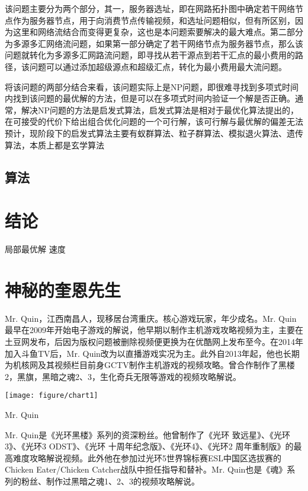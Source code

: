 \documentclass[a4paper,11pt,onecolumn,twoside]{article}
\makeatletter
\newenvironment{figurehere}
  {\def\@captype{figure}}
  {}
\makeatother
\begin{document}
\begin{multicols}{2}
该问题主要分为两个部分，其一，服务器选址，即在网路拓扑图中确定若干网络节点作为服务器节点，用于向消费节点传输视频，和选址问题相似，但有所区别，因为这里和网络流结合而变得更复杂，这也是本问题索要解决的最大难点。第二部分为多源多汇网络流问题，如果第一部分确定了若干网络节点为服务器节点，那么该问题就转化为多源多汇网路流问题，即寻找从若干源点到若干汇点的最小费用的路径，该问题可以通过添加超级源点和超级汇点，转化为最小费用最大流问题。

将该问题的两部分结合来看，该问题实际上是NP问题，即很难寻找到多项式时间内找到该问题的最优解的方法，但是可以在多项式时间内验证一个解是否正确。通常，解决NP问题的方法是启发式算法，启发式算法是相对于最优化算法提出的，在可接受的代价下给出组合优化问题的一个可行解，该可行解与最优解的偏差无法预计，现阶段下的启发式算法主要有蚁群算法、粒子群算法、模拟退火算法、遗传算法，本质上都是玄学算法

\subsection{算法}

\section{结论}
局部最优解
速度
\section{神秘的奎恩先生}

Mr. Quin，江西南昌人，现移居台湾重庆。核心游戏玩家，年少成名。Mr. Quin最早在2009年开始电子游戏的解说，他早期以制作主机游戏攻略视频为主，主要在土豆网发布，后因为版权问题被删除视频便更换为在优酷网上发布至今。在2014年加入斗鱼TV后，Mr. Quin改为以直播游戏实况为主。此外自2013年起，他也长期为机核网及其视频栏目前身GCTV制作主机游戏的视频攻略。曾合作制作了黑楼2，黑旗，黑暗之魂2、3，生化奇兵无限等游戏的视频攻略解说。

\begin{figurehere}
	\centering
	\texttt{[image: figure/chart1]}
	\caption{Mr. Quin}
	\label{chart1}
\end{figurehere}

Mr. Quin是《光环黑楼》系列的资深粉丝。他曾制作了《光环 致远星》、《光环3》、《光环3 ODST》、《光环 十周年纪念版》、《光环4》、《光环2 周年重制版》的最高难度攻略解说视频。此外他在参加过光环5世界锦标赛ESL中国区选拔赛的Chicken Eater/Chicken Catcher战队中担任指导和替补。Mr. Quin也是《魂》系列的粉丝、制作过黑暗之魂1、2、3的视频攻略解说。


\end{multicols}
\end{document}
